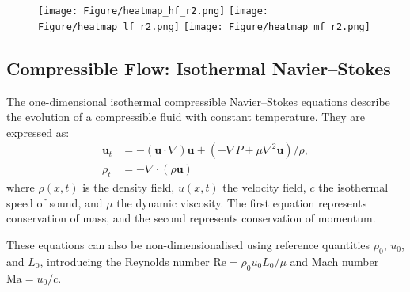 \begin{figure}
    \begin{center}
        \texttt{[image: Figure/heatmap\_hf\_r2.png]}%
        \texttt{[image: Figure/heatmap\_lf\_r2.png]}%
        \texttt{[image: Figure/heatmap\_mf\_r2.png]}
    \end{center}
\end{figure}
\subsection{Compressible Flow: Isothermal Navier–Stokes}

The one-dimensional isothermal compressible Navier–Stokes equations describe the evolution of a compressible fluid with constant temperature. They are expressed as:
\begin{equation}
\begin{aligned}
\mathbf{u}_t&=-(\mathbf{u} \cdot \nabla) \mathbf{u}+\left(-\nabla P+\mu \nabla^2 \mathbf{u}\right) / \rho, 
\\ \rho_t&=-\nabla \cdot(\rho \mathbf{u})
\end{aligned}
\end{equation}
where $\rho(x,t)$ is the density field, $u(x,t)$ the velocity field, $c$ the isothermal speed of sound, and $\mu$ the dynamic viscosity. The first equation represents conservation of mass, and the second represents conservation of momentum.

These equations can also be non-dimensionalised using reference quantities $\rho_0$, $u_0$, and $L_0$, introducing the Reynolds number $\mathrm{Re} = \rho_0 u_0 L_0 / \mu$ and Mach number $\mathrm{Ma} = u_0 / c$.
